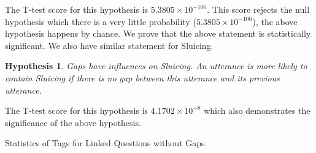 \documentclass[bsc,frontabs,twoside,singlespacing,parskip,deptreport]{infthesis}     %
\newtheorem{hypo}{Hypothesis}[chapter]
\begin{document}
The T-test score for this hypothesis is $5.3805 \times 10^{-106}$. This score rejects the null hypothesis which there is a very little probability ($5.3805 \times 10^{-106}$), the above hypothesis happens by chance. We prove that the above statement is statistically significant. We also have similar statement for Sluicing.

\begin{hypo}
Gaps have influences on Sluicing. An utterance is more likely to contain Sluicing if there is no gap between this utterance and its previous utterance.
\end{hypo}

The T-test score for this hypothesis is $4.1702 \times 10^{-8}$ which also demonstrates the significance of the above hypothesis.

\begin{minipage}{\textwidth}


        \begin{minipage}[t]{0.45\textwidth}
            \centering
            \makeatletter{}\makeatother


\caption{Statistics of Tags for Linked Questions without Gaps.}
\label{tab:quegaplink}



\end{minipage}
\end{minipage}
\end{document}
